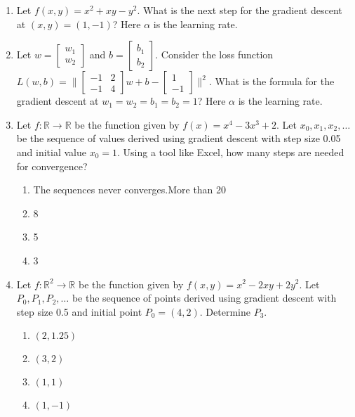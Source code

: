 \documentclass[twoside]{article}
\begin{document}
\begin{enumerate}

\item Let $f(x,y)=x^2+xy-y^2$. What is the next step for the gradient descent at $(x,y)=(1,-1)$? Here $\alpha$ is the learning rate.

\item Let $w=\displaystyle\begin{bmatrix}w_1 \\ w_2\end{bmatrix}$ and $b=\displaystyle\begin{bmatrix}b_1 \\ b_2\end{bmatrix}$. Consider the loss function $L(w,b)=\|\displaystyle\begin{bmatrix}-1& 2\\-1& 4\end{bmatrix}w+b-\displaystyle\begin{bmatrix}1\\-1\end{bmatrix}\|^2$. What is the formula for the gradient descent at $w_1=w_2=b_1=b_2=1$? Here $\alpha$ is the learning rate.

\item {Let $f: \mathbb{R} \rightarrow \mathbb{R}$ be the function given by $f(x) = x^4 - 3 x^3 + 2$. Let $x_0, x_1, x_2, \ldots$ be the sequence of values derived using gradient descent with step size 0.05 and initial value $x_0 = 1$. Using a tool like Excel, how many steps are needed for convergence?}
\begin{enumerate}
\item The sequences never converges.More than 20
\item 8
\item 5
\item 3
\end{enumerate}
 
\item {Let $f: \mathbb{R}^2 \rightarrow \mathbb{R}$ be the function given by $f(x,y) = x^2 - 2xy + 2y^2$. Let $P_0, P_1, P_2, \ldots$ be the sequence of points derived using gradient descent with step size 0.5 and initial point $P_0 = (4, 2)$. Determine $P_3$.}
\begin{enumerate}
 \item $(2, 1.25)$
 \item $(3, 2)$
 \item $(1, 1)$
 \item $(1, -1)$
\end{enumerate}

\end{enumerate}
\end{document}
